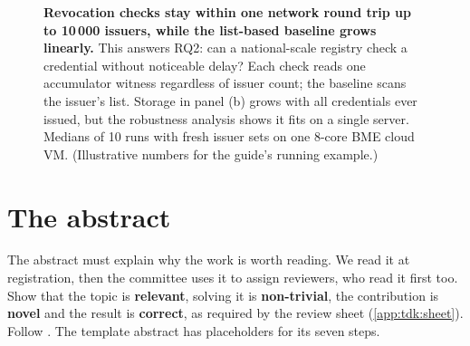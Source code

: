 \begin{figure}[!ht]
  \centering
  \caption{\textbf{Revocation checks stay within one network round trip up to 10\,000 issuers, while the list-based baseline grows linearly.} This answers RQ2: can a national-scale registry check a credential without noticeable delay? Each check reads one accumulator witness regardless of issuer count; the baseline scans the issuer's list. Storage in panel (b) grows with all credentials ever issued, but the robustness analysis shows it fits on a single server. Medians of 10 runs with fresh issuer sets on one 8-core BME cloud VM. (Illustrative numbers for the guide's running example.)}\label{fig:caption-example}
\end{figure}

\section{The abstract}\label{app:writing:abstract}
The abstract must explain why the work is worth reading. We read it at registration, then the committee uses it to assign reviewers, who read it first too. Show that the topic is \textbf{relevant}, solving it is \textbf{non-trivial}, the contribution is \textbf{novel} and the result is \textbf{correct}, as required by the review sheet (\cref{app:tdk:sheet}). Follow . The template abstract has placeholders for its seven steps.

